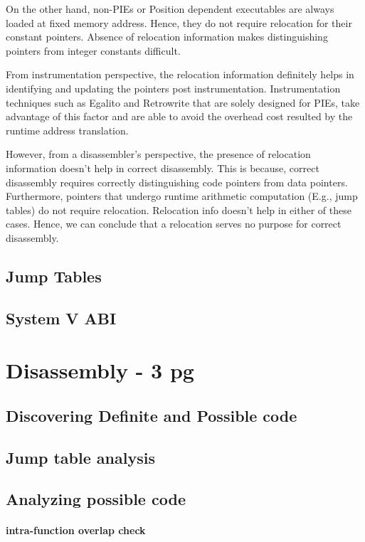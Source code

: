 On the other hand, non-PIEs or Position dependent executables are always loaded
at fixed memory address. Hence, they do not require relocation for their
constant pointers. Absence of relocation information makes distinguishing
pointers from integer constants difficult.

From instrumentation perspective, the relocation information definitely helps in
identifying and updating the pointers post instrumentation. Instrumentation
techniques such as Egalito \cite{} and Retrowrite \cite{} that are solely
designed for PIEs, take advantage of this factor and are able to avoid the
overhead cost resulted by  the runtime address translation.  

However, from a disassembler's perspective, the presence of relocation
information doesn't help in correct disassembly. This is because, correct
disassembly requires correctly distinguishing code pointers from data pointers.
Furthermore, pointers that undergo runtime arithmetic computation (E.g., jump
tables) do not require relocation. Relocation info doesn't help in either of
these cases. Hence, we can conclude that a relocation serves no purpose for
correct disassembly. 

\subsection{Jump Tables} 

\subsection{System V ABI}

\section{Disassembly - 3 pg}
\subsection{Discovering Definite and Possible code}
\subsection{Jump table analysis}
\subsection{Analyzing possible code}
\paragraph{intra-function overlap check}
